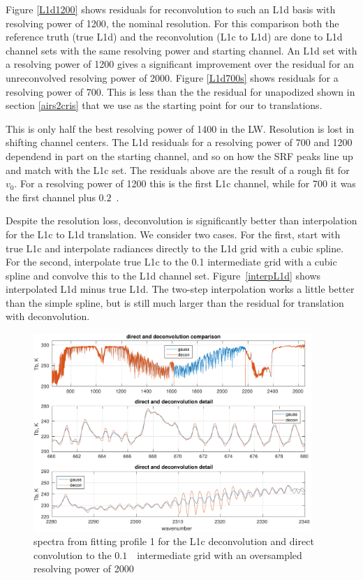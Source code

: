 \documentclass[11pt]{article}
\begin{document}

Figure \ref{L1d1200} shows residuals for reconvolution to such an L1d
basis with resolving power of 1200, the nominal {\airs} resolution.
For this comparison both the reference truth (true L1d) and the
reconvolution (L1c to L1d) are done to L1d channel sets with the same
resolving power and starting channel.  An L1d set with a resolving
power of 1200 gives a significant improvement over the residual for
an unreconvolved resolving power of 2000.  Figure \ref{L1d700s} shows
residuals for a resolving power of 700.  This is less than the the
residual for unapodized {\cris} shown in section \ref{airs2cris} that
we use as the starting point for our {\airs} to {\cris} translations.

This is only half the best {\airs} resolving power of 1400 in the LW.
Resolution is lost in shifting channel centers.  The L1d residuals
for a resolving power of 700 and 1200 dependend in part on the
starting channel, and so on how the SRF peaks line up and match with
the L1c set.  The residuals above are the result of a rough fit for
$v_0$.  For a resolving power of 1200 this is the first L1c channel,
while for 700 it was the first channel plus $0.2$~\wn.

Despite the resolution loss, deconvolution is significantly better
than interpolation for the L1c to L1d translation.  We consider two
cases.  For the first, start with true L1c and interpolate radiances
directly to the L1d grid with a cubic spline.  For the second,
interpolate true L1c to the 0.1 {\wn} intermediate grid with a cubic
spline and convolve this to the L1d channel set.
Figure~\ref{interpL1d} shows interpolated L1d minus true L1d.  The
two-step interpolation works a little better than the simple spline,
but is still much larger than the residual for translation with
deconvolution.

\begin{figure} %
  \centering
  \includegraphics[height=7.5cm]{figures/airs_decon_spec.pdf}
  \caption{spectra from fitting profile 1 for the L1c deconvolution
    and direct convolution to the $0.1$~\wn\ intermediate grid with
    an oversampled resolving power of 2000}
  \label{dspec}
\end{figure}
\end{document}
